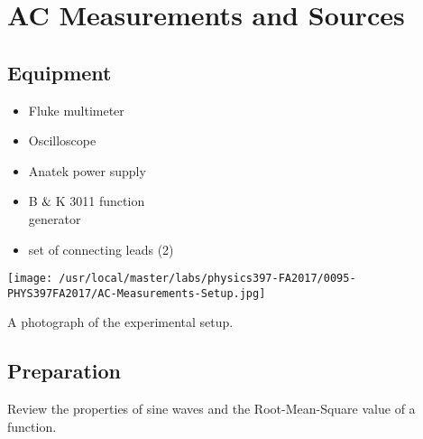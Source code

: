 

%
%


\setcounter{chapter}{3}
\setcounter{equation}{0}
\setcounter{table}{0}
\setcounter{figure}{0}

\chapter{AC Measurements and Sources}

\section{{\bf Equipment}}

\begin{minipage}[t]{0.55\textwidth}
\begin{itemize}[noitemsep]
\item Fluke multimeter
\item Oscilloscope
\item Anatek power supply
\end{itemize}
\end{minipage}
\begin{minipage}[t]{0.45\textwidth}
\begin{itemize}[noitemsep]
\item B$\And$K 3011 function \\generator
\item set of connecting leads (2)
\end{itemize}
\end{minipage}

\begin{marginfigure}
\texttt{[image: /usr/local/master/labs/physics397-FA2017/0095-PHYS397FA2017/AC-Measurements-Setup.jpg]}
\caption{A photograph of the experimental setup.}
\label{fig:ACsetup}
\end{marginfigure}

\section{{\bf Preparation}}
Review the properties of sine waves and the Root-Mean-Square value of a function.

